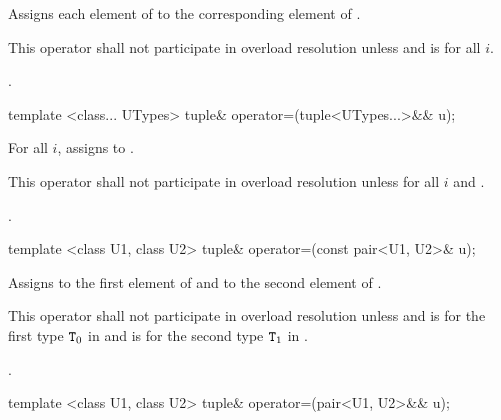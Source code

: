 \begin{itemdescr}
\pnum
\effects Assigns each element of  to the corresponding element
of .

\pnum
\remarks This operator shall not participate in overload resolution unless
 and
 is  for all $i$.

\pnum
\returns {}.
\end{itemdescr}

%
\begin{itemdecl}
template <class... UTypes> tuple& operator=(tuple<UTypes...>&& u);
\end{itemdecl}

\begin{itemdescr}
\pnum
\effects For all $i$, assigns  to
.

\pnum
\remarks This operator shall not participate in overload resolution unless
 for all $i$ and
.

\pnum
\returns {}.
\end{itemdescr}

%
%
\begin{itemdecl}
template <class U1, class U2> tuple& operator=(const pair<U1, U2>& u);
\end{itemdecl}

\begin{itemdescr}
\pnum
\effects  Assigns  to the first element of 
and  to the second element of .

\pnum
\remarks This operator shall not participate in overload resolution unless
 and
 is  for the first type $\texttt{T}_0$ in
 and  is  for the
second type $\texttt{T}_1$ in .

\pnum
\returns {}.
\end{itemdescr}

%
%
\begin{itemdecl}
template <class U1, class U2> tuple& operator=(pair<U1, U2>&& u);
\end{itemdecl}

